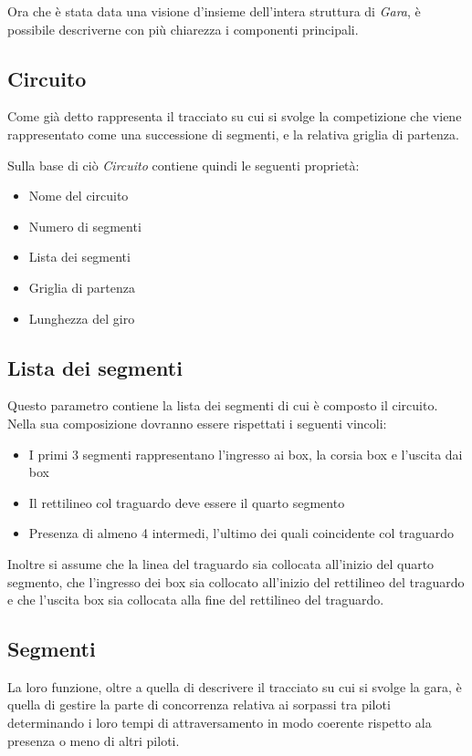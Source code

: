 \documentclass[a4paper,11pt, twoside]{book}
\begin{document}
      Ora che è stata data una visione d'insieme dell'intera struttura di \textsl{Gara}, è possibile descriverne con più
      chiarezza i componenti principali.
	
      \subsection{Circuito}
	Come già detto rappresenta il tracciato su cui si svolge la competizione che viene rappresentato come una successione
	di segmenti, e la relativa griglia di partenza.
	
	Sulla base di ciò \textsl{Circuito} contiene quindi le seguenti proprietà:
	
	\begin{itemize}
	  \item Nome del circuito
	  \item Numero di segmenti
	  \item Lista dei segmenti
	  \item Griglia di partenza
	  \item Lunghezza del giro
	\end{itemize}
	  
	\subsection{Lista dei segmenti}
	  Questo parametro contiene la lista dei segmenti di cui è composto il circuito. Nella sua composizione
	  dovranno essere rispettati i seguenti vincoli:
	  
	  \begin{itemize}
	    \item I primi 3 segmenti rappresentano l'ingresso ai box, la corsia box e l'uscita dai box
	    \item Il rettilineo col traguardo deve essere il quarto segmento
	    \item Presenza di almeno 4 intermedi, l'ultimo dei quali coincidente col traguardo
	  \end{itemize}
	  
	  Inoltre si assume che la linea del traguardo sia collocata all'inizio del quarto segmento, che 
	  l'ingresso dei box sia collocato all'inizio del rettilineo del traguardo e che l'uscita box sia collocata
	  alla fine del rettilineo del traguardo.

      \subsection{Segmenti}
	La loro funzione, oltre a quella di descrivere il tracciato su cui si svolge la gara, è quella
	di gestire la parte di concorrenza relativa ai sorpassi tra piloti determinando i loro tempi di attraversamento
	in modo coerente rispetto ala presenza o meno di altri piloti.
	
\end{document}
